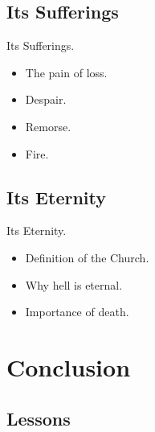 \documentclass{beamer}
\begin{document}
\subsection{Its Sufferings}
\begin{frame}{Its Sufferings.}
\begin{itemize}
 \item  The pain of loss.
 \item  Despair.
 \item  Remorse.
 \item  Fire.
\end{itemize}
\end{frame}
\subsection{Its Eternity}
\begin{frame}{Its Eternity.}
\begin{itemize}
 \item  Definition of the Church.
 \item  Why hell is eternal.
 \item  Importance of death.
\end{itemize}
\end{frame}

\section{Conclusion}

\subsection{Lessons}
\end{document}
